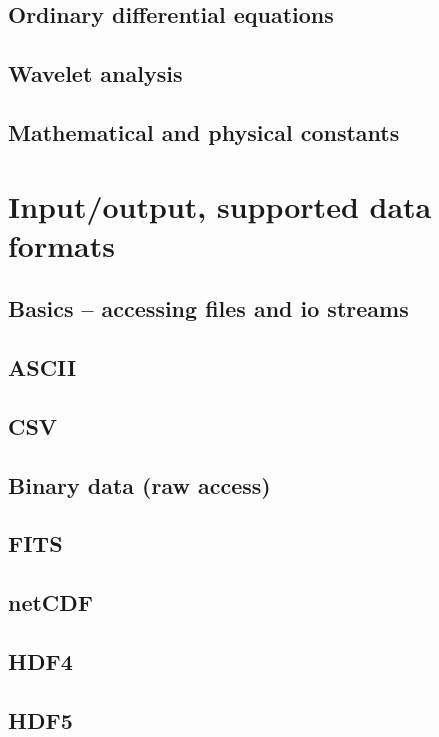 \documentclass[10pt,titleauthor,openany]{mwbk}
\begin{document}
  \section{Ordinary differential equations}
  
  \section{Wavelet analysis}
  
  \section{Mathematical and physical constants}
  

  \chapter{Input/output, supported data formats}
  \section{Basics -- accessing files and io streams}
  
  \section{ASCII}
  
  \section{CSV}
  
  \section{Binary data (raw access)}
  
  \section{FITS}
  
  \section{netCDF}
  
  \section{HDF4}
  
  \section{HDF5}
  
\end{document}
